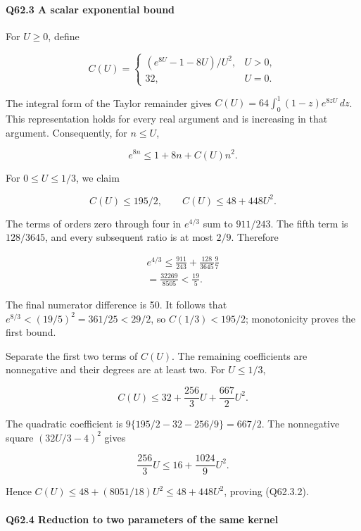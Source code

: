 \paragraph{Q62.3 A scalar exponential bound}

For $U\ge\allowbreak 0$, define

\[
C(U)=
\begin{cases}(e^{8U}-1-8U)/U^2,&U>0,\\32,&U=0.
\end{cases}
\]

The integral form of the Taylor remainder gives
$C(U)=\allowbreak 64\int_0^1(1-z)e^{8zU}\,\allowbreak  dz$.
This representation holds for every real argument and is increasing in that argument. Consequently, for $n\le\allowbreak  U$,

\[
e^{8n}\le1+8n+C(U)n^2.
\tag{Q62.3.1}\label{eq:Q62:Q62:3:1}
\]

For $0\le\allowbreak  U\le\allowbreak 1/3$, we claim

\[
\boxed{C(U)\le195/2,\qquad C(U)\le48+448U^2.}
\tag{Q62.3.2}\label{eq:Q62:Q62:3:2}
\]

The terms of orders zero through four in $e^{4/3}$ sum to $911/243$.
The fifth term is $128/3645$, and every subsequent ratio is at most $2/9$. Therefore

\[
\begin{gathered}
e^{4/3}\le\frac{911}{243}+\frac{128}{3645}\frac9{7}\\
=\frac{32269}{8505}<\frac{19}{5}.
\end{gathered}
\]

The final numerator difference is 50. It follows that
$e^{8/3}<\allowbreak (19/5)^2=\allowbreak 361/25<\allowbreak 29/2$,
so $C(1/3)<\allowbreak 195/2$; monotonicity proves the first bound.

Separate the first two terms of $C(U)$. The remaining coefficients are nonnegative and their degrees are at least two. For $U\le\allowbreak 1/3$,

\[
C(U)\le32+\frac{256}{3}U+\frac{667}{2}U^2.
\]

The quadratic coefficient is
$9\{195/2-32-256/9\}=\allowbreak 667/2$.
The nonnegative square $(32U/3-4)^2$ gives

\[
\frac{256}{3}U\le16+\frac{1024}{9}U^2.
\]

Hence $C(U)\le\allowbreak 48+(8051/18)U^2\le\allowbreak 48+448U^2$, proving (Q62.3.2).


\paragraph{Q62.4 Reduction to two parameters of the same kernel}

